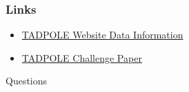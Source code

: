 \documentclass{beamer}
\begin{document}
    \begin{frame}
        \frametitle{Links}
        \begin{itemize}
            \item \href{https://tadpole.grand-challenge.org/Data/}{TADPOLE Website Data Information}
            \item \href{https://arxiv.org/pdf/1805.03909.pdf}{TADPOLE Challenge Paper}
        \end{itemize}
    \end{frame}


    \begin{frame}
        \begin{center}
        {\Huge {} Questions}
        \end{center}
    \end{frame}
\end{document}
